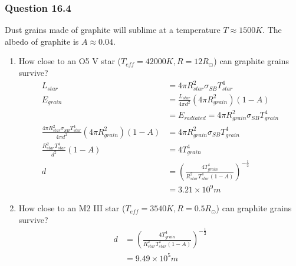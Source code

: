 \documentclass{math}
\begin{document}
\subsubsection*{Question 16.4}
Dust grains made of graphite will sublime at a temperature \( T\approx1500K \).
The albedo of graphite is \( A\approx0.04 \).
\begin{enumerate}
  \item How close to an O5 V star (\( T_{eff} = 42000K, R = 12R_{\odot}
    \)) can graphite grains survive?
  \begin{align*}
    L_{star} &= 4\pi R_{star}^2\sigma_{SB}T_{star}^4 \\
    E_{grain} &= \frac{L_{star}}{4\pi d^2}(4\pi R_{grain}^2)(1-A) \\
    &= E_{radiated} = 4\pi R_{grain}^2\sigma_{SB}T_{grain}^4 \\
    \frac{4\pi R_{star}^2\sigma_{SB}T_{star}^4}{4\pi d^2}(4\pi R_{grain}^2)
    (1-A) &= 4\pi R_{grain}^2\sigma_{SB}T_{grain}^4 \\
    \frac{R_{star}^2T_{star}^4}{d^2}(1-A) &= 4T_{grain}^4 \\
    d &= \left(\frac{4T_{grain}^4}{R_{star}^2T_{star}^4(1-A)}\right)^{
      -\frac{1}{2}} \\
    &= 3.21\times10^{9}m
  \end{align*}
  \item How close to an M2 III star (\( T_{eff} = 3540K, R = 0.5R_{\odot} \))
    can graphite grains survive?
  \begin{align*}
    d &= \left(\frac{4T_{grain}^4}{R_{star}^2T_{star}^4(1-A)}\right)^{
      -\frac{1}{2}} \\
    &= 9.49\times10^{5}m
  \end{align*}
\end{enumerate}
\end{document}
